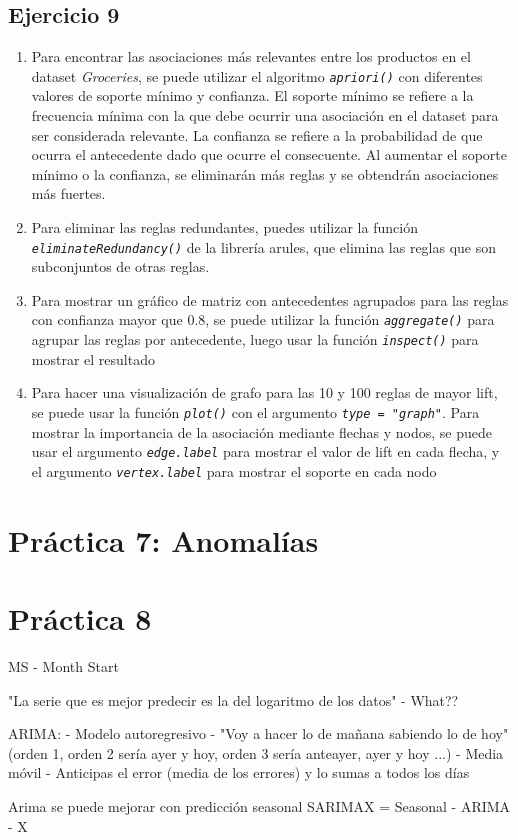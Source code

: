 \documentclass[
12pt, 
spanish, 
singlespacing,
headsepline
]{article}
\newcommand{\code}[1]{\textit{\texttt{#1}}}
\begin{document}
\subsection{Ejercicio 9}
\begin{enumerate}
\item Para encontrar las asociaciones más relevantes entre los productos en el dataset \emph{Groceries}, se puede utilizar el algoritmo \code{apriori()} con diferentes valores de soporte mínimo y confianza. El soporte mínimo se refiere a la frecuencia mínima con la que debe ocurrir una asociación en el dataset para ser considerada relevante. La confianza se refiere a la probabilidad de que ocurra el antecedente dado que ocurre el consecuente. Al aumentar el soporte mínimo o la confianza, se eliminarán más reglas y se obtendrán asociaciones más fuertes.

\item Para eliminar las reglas redundantes, puedes utilizar la función \code{eliminateRedundancy()} de la librería arules, que elimina las reglas que son subconjuntos de otras reglas.

\item Para mostrar un gráfico de matriz con antecedentes agrupados para las reglas con confianza mayor que 0.8, se puede utilizar la función \code{aggregate()} para agrupar las reglas por antecedente, luego usar la función \code{inspect()} para mostrar el resultado

\item Para hacer una visualización de grafo para las 10 y 100 reglas de mayor lift, se puede usar la función \code{plot()} con el argumento \code{type = "graph"}. Para mostrar la importancia de la asociación mediante flechas y nodos, se puede usar el argumento \code{edge.label} para mostrar el valor de lift en cada flecha, y el argumento \code{vertex.label} para mostrar el soporte en cada nodo
\end{enumerate}

\section{Práctica 7: Anomalías}



\section{Práctica 8}
MS -\> Month Start

"La serie que es mejor predecir es la del logaritmo de los datos" - What??

ARIMA:
- Modelo autoregresivo - "Voy a hacer lo de mañana sabiendo lo de hoy" (orden 1, orden 2 sería ayer y hoy, orden 3 sería anteayer, ayer y hoy ...)
- Media móvil - Anticipas el error (media de los errores) y lo sumas a todos los días

Arima se puede mejorar con predicción seasonal
SARIMAX = Seasonal - ARIMA - X
\end{document}
